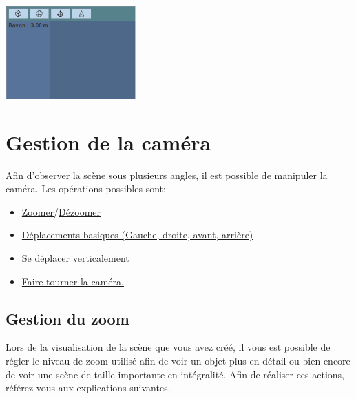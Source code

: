 \documentclass[11pt]{report}
\begin{document}
\begin{center}
    \includegraphics[width=5cm]{ajoutFormes}
\end{center}


\chapter{Gestion de la caméra}


Afin d'observer la scène sous plusieurs angles, il est possible de manipuler la caméra. Les opérations possibles sont:
\begin{itemize}
        \item \hyperlink{zoom}{Zoomer}/\hyperlink{dezoom}{Dézoomer}
        \item \hyperlink{move}{Déplacements basiques (Gauche, droite, avant, arrière)}
        \item \hyperlink{moveV}{Se déplacer verticalement}
        \item \hyperlink{rotate}{Faire tourner la caméra.}
\end{itemize}

\section{Gestion du zoom}

Lors de la visualisation de la scène que vous avez créé, il vous est possible de régler le niveau de zoom utilisé afin de voir un objet plus en détail ou bien encore de voir une scène de taille importante en intégralité. Afin de réaliser ces actions, référez-vous aux explications suivantes.
\end{document}
